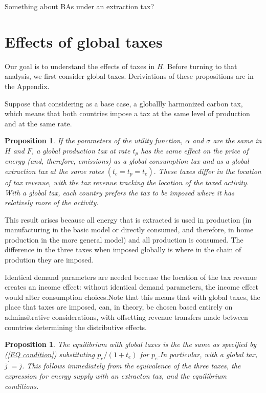 \documentclass[notitlepage,12pt]{article}
\newtheorem{proposition}[theorem]{Proposition}
\begin{document}
Something about BAs under an extraction tax?

\section{Effects of global taxes}

Our goal is to understand the effects of taxes in $H$. Before turning to
that analysis, we first consider global taxes. Deriviations of these
propositions are in the Appendix.

Suppose that considering as a base case, a globallly harmonized carbon tax,
which means that both countries impose a tax at the same level of production
and at the same rate.

\begin{proposition}
If the parameters of the utility function, $\alpha $ and $\sigma $ are the
same in $H$ and $F$, a global production tax at rate $t_{p}$ has the same
effect on the price of energy (and, therefore, emissions) as a global
consumption tax and as a global extraction tax at the same rates $\left(
t_{c}=t_{p}=t_{e}\right) .$ These taxes differ in the location of tax
revenue, with the tax revenue tracking the location of the taxed activity.
With a global tax, each country prefers the tax to be imposed where it has
relatively more of the activity.
\end{proposition}

This result arises because all energy that is extracted is used in
production (in manufacturing in the basic model or directly consumed, and
therefore, in home production in the more general model) and all production
is consumed. The difference in the three taxes when imposed globally is
where in the chain of prodution they are imposed. 

Identical demand parameters are needed because the location of the tax
revenue creates an income effect: without identical demand parameters, the
income effect would alter consumption choices.Note that this means that with
global taxes, the place that taxes are imposed, can, in theory, be chosen
based entirely on adminsitrative considerations, with offsetting revenue
transfers made between countries determining the distributive effects.

\begin{proposition}
The equilibrium with global taxes is the the same as specified by (\ref{EQ
condition}) substituting $p_{e}/\left( 1+t_{e}\right) $ for $p_{e}$.In
particular, with a global tax, $\bar{j}^{\prime }=\bar{j}$. This follows
immediately from the equivalence of the three taxes, the expression for
energy supply with an extracton tax, and the equilibrium conditions.
\end{proposition}
\end{document}
